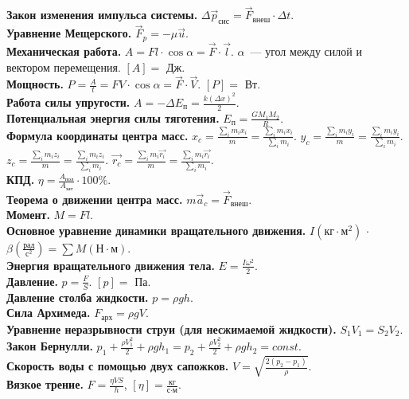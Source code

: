 \documentclass[12pt]{article}
\begin{document}
	\textbf{Закон изменения импульса системы.} $\varDelta \vec{p}_{\text{сис}} = \vec{F}_{\text{внеш}} \cdot \varDelta t$. \\
	\textbf{Уравнение Мещерского.} $\vec{F}_{p} = -\mu \vec{u}$. \\
	\textbf{Механическая работа.} $A = Fl \cdot \cos \alpha = \vec{F} \cdot \vec{l}$. $\alpha$~--- угол между силой и вектором перемещения. $[A] =$ Дж. \\
	\textbf{Мощность.} $P = \frac{A}{t} = FV \cdot \cos \alpha = \vec{F} \cdot \vec{V}$. $[P] =$ Вт. \\
	\textbf{Работа силы упругости.} $A = -\varDelta E_{\text{п}} = \frac{k (\varDelta x)^2}{2}$. \\
	\textbf{Потенциальная энергия силы тяготения.}
	$E_{\text{п}} = \frac{GM_1M_2}{R}$. \\
	\textbf{Формула координаты центра масс.} $x_c = \frac{\sum\limits_i m_i x_i}{m} = \frac{\sum\limits_i m_i x_i}{\sum\limits_i m_i}$. $y_c = \frac{\sum\limits_i m_i y_i}{m} = \frac{\sum\limits_i m_i y_i}{\sum\limits_i m_i}$. $z_c = \frac{\sum\limits_i m_i z_i}{m} = \frac{\sum\limits_i m_i z_i}{\sum\limits_i m_i}$. $\vec{r_c} = \frac{\sum\limits_i m_i \vec{r_i}}{m} = \frac{\sum\limits_i m_i \vec{r_i}}{\sum\limits_i m_i}$. \\
	\textbf{КПД.} $\eta = \frac{A_{\text{пол}}}{A_{\text{зат}}} \cdot 100\%$. \\
	\textbf{Теорема о движении центра масс.} $m \vec{a}_c = \vec{F}_{\text{внеш}}$. \\
	\textbf{Момент.} $M = Fl$. \\
	\textbf{Основное уравнение динамики вращательного движения.} $I (\text{кг} \cdot \text{м}^2)$ $\cdot$ $\beta (\frac{\text{рад}}{\text{с}^2}) = \sum M (\text{Н} \cdot \text{м})$. \\
	\textbf{Энергия вращательного движения тела.} $E = \frac{I\omega^2}{2}$. \\
	\textbf{Давление.} $p = \frac{F}{S}$. $[p] =$ Па. \\
	\textbf{Давление столба жидкости.} $p = \rho g h$. \\
	\textbf{Сила Архимеда.} $F_{\text{арх}} = \rho g V$. \\
	\textbf{Уравнение неразрывности струи (для несжимаемой жидкости).} $S_1V_1 = S_2V_2$. \\
	\textbf{Закон Бернулли.} $p_1 + \frac{\rho V_1^2}{2} + \rho g h_1 = p_2 + \frac{\rho V_2^2}{2} + \rho g h_2 = const$. \\
	\textbf{Скорость воды с помощью двух сапожков.} $V = \sqrt{\frac{2(p_2 - p_1)}{\rho}}$. \\
	\textbf{Вязкое трение.}	$F = \frac{\eta V S}{h}$, $[\eta] = \frac{\text{кг}}{\text{с} \cdot \text{м}}$.
\end{document}
